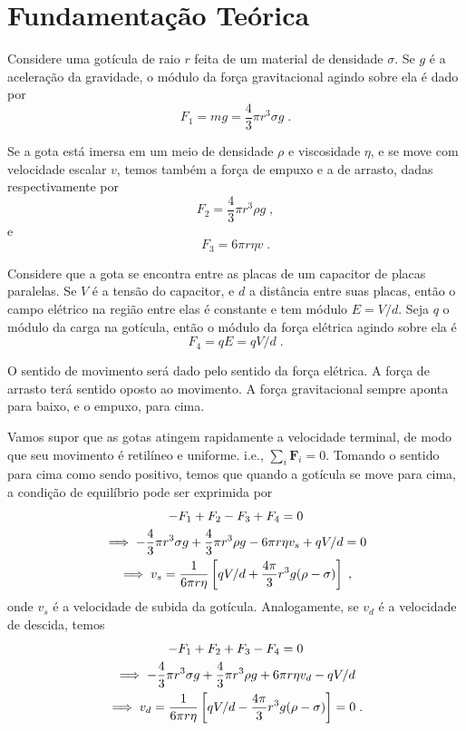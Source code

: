 \section{Fundamentação Teórica}

Considere uma gotícula de raio $r$ feita de um material de densidade $\sigma$.
Se $g$ é a aceleração da gravidade, o módulo da força gravitacional agindo sobre ela é dado por
\begin{equation}
F_1 = mg = \frac{4}{3} \pi r^3 \sigma g \;.
\label{eq: F_gravitational}
\end{equation}

Se a gota está imersa em um meio de densidade $\rho$ e viscosidade $\eta$,
e se move com velocidade escalar $v$, temos também a força de empuxo e a de arrasto, 
dadas respectivamente por
\begin{equation}
F_2 = \frac{4}{3} \pi r^3 \rho g \;,
\label{eq: F_buoyancy}
\end{equation} e
\begin{equation}
F_3 = 6 \pi r \eta v \;.
\label{eq: F_drag}
\end{equation}

Considere que a gota se encontra entre as placas de um capacitor de placas paralelas. 
Se $V$ é a tensão do capacitor, e $d$ a distância entre suas placas, então o campo elétrico 
na região entre elas é constante e tem módulo $E = V/d$. Seja $q$ o módulo da carga na 
gotícula, então o módulo da força elétrica agindo sobre ela é 
\begin{equation}
F_4 = qE = qV/d \;.
\label{eq: F_electric}
\end{equation} 

O sentido de movimento será dado pelo sentido da força elétrica. A força de arrasto terá sentido 
oposto ao movimento. A força gravitacional sempre aponta para baixo, e o empuxo, para cima.

Vamos supor que as gotas atingem rapidamente a velocidade terminal, de modo que 
seu movimento é retilíneo e uniforme. i.e., $\sum_i \mathbf F_i = 0$. 
Tomando o sentido para cima como sendo positivo, temos que quando a gotícula se move para cima, 
a condição de equilíbrio pode ser exprimida por 
\begin{gather}
-F_1 +F_2 -F_3 +F_4 = 0 \notag \\
\implies - {\frac{4}{3} \pi r^3 \sigma g} + {\frac{4}{3} \pi r^3 \rho g} - {6 \pi r \eta v_s} + {qV/d} = 0 \notag \\
\implies v_s = \frac{1}{6 \pi r \eta} \left[ qV/d + \frac{4\pi}{3} r^3 g (\rho - \sigma) \right] \;,
\label{eq: v_subida}
\end{gather}
\noindent onde $v_s$ é a velocidade de subida da gotícula. 
Analogamente, se $v_d$ é a velocidade de descida, temos
\begin{gather}
-F_1 +F_2 + F_3 - F_4 = 0 \notag \\
\implies - {\frac{4}{3} \pi r^3 \sigma g} + {\frac{4}{3} \pi r^3 \rho g} + {6 \pi r \eta v_d} -{qV/d}   \notag \\
\implies v_d = \frac{1}{6 \pi r \eta} \left[ qV/d - \frac{4\pi}{3} r^3 g (\rho - \sigma) \right] = 0\;.
\label{eq: v_descida}
\end{gather}

